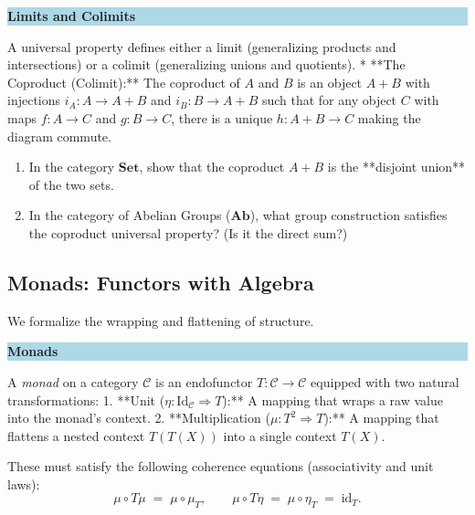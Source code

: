 \documentclass[12pt, a4paper]{article}
\newenvironment{namedconcept}[1]
  {\par\medskip\fillcolorbox{LightBlue}{NavyBlue}{#1}}
  {\par\medskip}
\newcommand{\fillcolorbox}[3]{%
  \noindent
  \filldrawbox{#1}{#2}{\textbf{\sffamily\color{white}#3}}\par\nobreak\vspace{4pt}
}
\newcommand{\filldrawbox}[3]{%
  \colorbox{#1}{\parbox{\dimexpr\linewidth-2\fboxsep\relax}{%
    \vspace{4pt}\noindent\hspace{4pt}#3\vspace{4pt}%
  }}%
}
\newcommand{\newterm}[1]{\textit{\textcolor{DiscoveryColor}{#1}}}
\begin{document}
\begin{namedconcept}{Limits and Colimits}
A universal property defines either a limit (generalizing products and intersections) or a colimit (generalizing unions and quotients).
* **The Coproduct (Colimit):** The coproduct of $A$ and $B$ is an object $A + B$ with injections $i_A: A \to A+B$ and $i_B: B \to A+B$ such that for any object $C$ with maps $f: A \to C$ and $g: B \to C$, there is a unique $h: A+B \to C$ making the diagram commute.
\begin{center}
\end{center}
\end{namedconcept}

\begin{enumerate}[label=(\alph*), leftmargin=*]
  \item In the category $\mathbf{Set}$, show that the coproduct $A + B$ is the **disjoint union** of the two sets.
  \item In the category of Abelian Groups ($\mathbf{Ab}$), what group construction satisfies the coproduct universal property? (Is it the direct sum?)
\end{enumerate}

\subsection{Monads: Functors with Algebra}

We formalize the wrapping and flattening of structure.

\begin{namedconcept}{Monads}
A \newterm{monad} on a category $\mathcal{C}$ is an endofunctor $T: \mathcal{C} \to \mathcal{C}$ equipped with two natural transformations:
1. **Unit ($\eta: \text{Id}_{\mathcal{C}} \Rightarrow T$):** A mapping that wraps a raw value into the monad's context.
2. **Multiplication ($\mu: T^2 \Rightarrow T$):** A mapping that flattens a nested context $T(T(X))$ into a single context $T(X)$.

These must satisfy the following coherence equations (associativity and unit laws):
\[
  \mu \circ T\mu \;=\; \mu \circ \mu_T, \qquad \mu \circ T\eta \;=\; \mu \circ \eta_T \;=\; \text{id}_T.
\]
\end{namedconcept}
\end{document}
